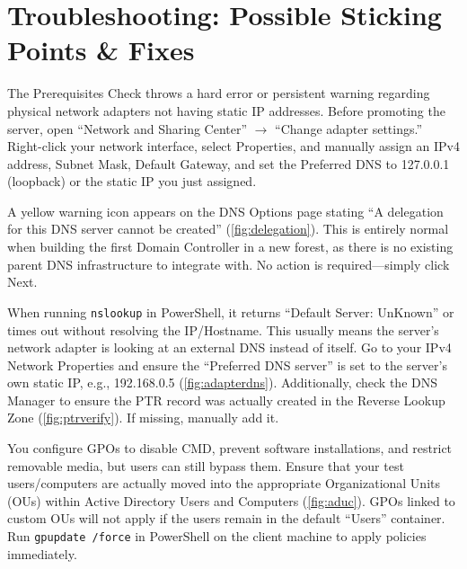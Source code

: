 
\section{Troubleshooting: Possible Sticking Points \& Fixes}
\label{sec:troubleshooting}

{The Prerequisites Check throws a hard error or persistent warning regarding physical network adapters not having static IP addresses.}
{Before promoting the server, open ``Network and Sharing Center'' $\rightarrow$ ``Change adapter settings.'' Right-click your network interface, select Properties, and manually assign an IPv4 address, Subnet Mask, Default Gateway, and set the Preferred DNS to 127.0.0.1 (loopback) or the static IP you just assigned.}

{A yellow warning icon appears on the DNS Options page stating ``A delegation for this DNS server cannot be created'' (\autoref{fig:delegation}).}
{This is entirely normal when building the first Domain Controller in a new forest, as there is no existing parent DNS infrastructure to integrate with. No action is required---simply click Next.}

{When running \texttt{nslookup} in PowerShell, it returns ``Default Server: UnKnown'' or times out without resolving the IP/Hostname.}
{This usually means the server's network adapter is looking at an external DNS instead of itself. Go to your IPv4 Network Properties and ensure the ``Preferred DNS server'' is set to the server's own static IP, e.g., 192.168.0.5 (\autoref{fig:adapterdns}). Additionally, check the DNS Manager to ensure the PTR record was actually created in the Reverse Lookup Zone (\autoref{fig:ptrverify}). If missing, manually add it.}

{You configure GPOs to disable CMD, prevent software installations, and restrict removable media, but users can still bypass them.}
{Ensure that your test users/computers are actually moved into the appropriate Organizational Units (OUs) within Active Directory Users and Computers (\autoref{fig:aduc}). GPOs linked to custom OUs will not apply if the users remain in the default ``Users'' container. Run \texttt{gpupdate /force} in PowerShell on the client machine to apply policies immediately.}
